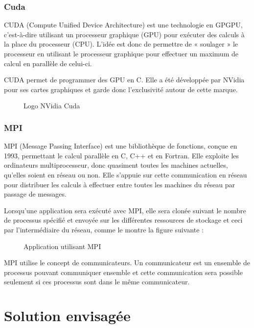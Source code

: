 \documentclass[final]{polytech/polytech}
\begin{document}
\section{Cuda}
CUDA (Compute Unified Device Architecture) est une technologie en GPGPU, c’est-à-dire utilisant un processeur graphique (GPU) pour exécuter des calculs à la place du processeur (CPU). L’idée est donc de permettre de « soulager » le processeur en utilisant le processeur graphique pour effectuer un maximum de calcul en parallèle de celui-ci.

CUDA permet de programmer des GPU en C. Elle a été développée par NVidia pour ses cartes graphiques et garde donc l’exclusivité autour de cette marque.

\begin{figure}
	\caption{Logo NVidia Cuda}
	\label{fig:logo_nvidia_cuda}
\end{figure}

\vfill\eject

\section{MPI}
MPI (Message Passing Interface) est une bibliothèque de fonctions, conçue en 1993, permettant le calcul parallèle en C, C++ et en Fortran. Elle exploite les ordinateurs multiprocesseur, donc quasiment toutes les machines actuelles, qu'elles soient en réseau ou non. Elle s'appuie sur cette communication en réseau pour distribuer les calculs à effectuer entre toutes les machines du réseau par passage de messages.

Lorsqu'une application sera exécuté avec MPI, elle sera clonée suivant le nombre de processus spécifié et envoyée sur les différentes ressources de stockage et ceci par l'intermédiaire du réseau, comme le montre la figure suivante :

\begin{figure}
	\caption{Application utilisant MPI}
	\label{fig:mpi_app}
\end{figure}

MPI utilise le concept de communicateurs. Un communicateur est un ensemble de processus pouvant communiquer ensemble et cette communication sera possible seulement si ces processus sont dans le même communicateur.

\part{Solution envisagée}
\end{document}
